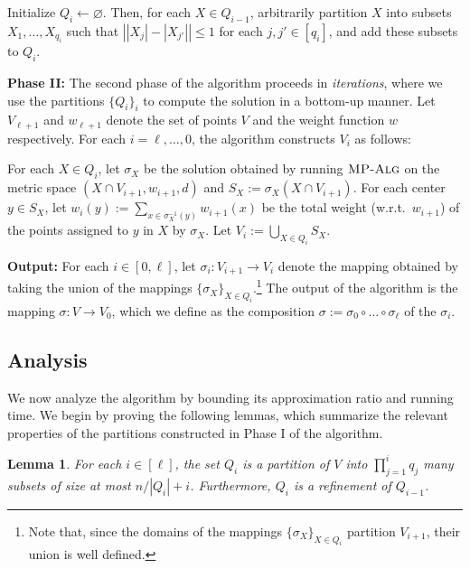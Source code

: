 \documentclass[11pt]{article}
\newenvironment{wrapper}[1]
{
\begin{center}
		\begin{minipage}{\linewidth}
			\begin{mdframed}[hidealllines=true, backgroundcolor=gray!20, leftmargin=0cm,innerleftmargin=0.4cm,innerrightmargin=0.4cm,innertopmargin=0.4cm,innerbottommargin=0.4cm,roundcorner=0pt]
				#1}
			{\end{mdframed}
		\end{minipage}
	\end{center}
}
\newcommand{\1}{\mathmybb{1}}
\newtheorem{lemma}[theorem]{Lemma}
\newcommand{\MPAlg}{\textnormal{\textsc{MP-Alg}}}
\begin{document}
\begin{wrapper}
    Initialize $Q_i \leftarrow \varnothing$. Then, for each $X \in Q_{i-1}$, arbitrarily partition $X$ into subsets $X_1, \dots, X_{q_i}$ such that $\left||X_{j}| - |X_{j'}|\right| \leq 1$ for each $j,j' \in [q_i]$, and add these subsets to $Q_i$.
\end{wrapper}

\medskip
\noindent
\textbf{Phase II:}
The second phase of the algorithm proceeds in \emph{iterations}, where we use the partitions $\{Q_i\}_i$ to compute the solution in a bottom-up manner.
Let $V_{\ell + 1}$ and $w_{\ell + 1}$ denote the set of points $V$ and the weight function $w$ respectively.
For each $i = \ell ,\dots, 0$, the algorithm constructs $V_i$ as follows:

\begin{wrapper}
    For each $X \in Q_i$, let $\sigma_X$ be the solution obtained by running $\MPAlg$ on the metric space $(X \cap V_{i+1},w_{i+1},d)$ and $S_X := \sigma_X(X \cap V_{i+1})$. For each center $y \in S_X$, let $w_i(y) := \sum_{x \in \sigma_{X}^{-1}(y)} w_{i+1}(x)$ be the total weight (w.r.t.~$w_{i+1}$) of the points assigned to $y$ in $X$ by $\sigma_X$. Let $V_i := \bigcup_{X \in Q_i} S_X$.
\end{wrapper}

\medskip
\noindent
\textbf{Output:}
For each $i \in [0, \ell]$, let $\sigma_i : V_{i+1} \longrightarrow V_i$ denote the mapping obtained by taking the union of the mappings $\{\sigma_X\}_{X \in Q_i}$.\footnote{Note that, since the domains of the mappings $\{\sigma_X\}_{X \in Q_i}$ partition $V_{i+1}$, their union is well defined.}
The output of the algorithm is the mapping $\sigma : V \longrightarrow V_0$, which we define as the composition
$\sigma := \sigma_{0} \circ \dots \circ \sigma_{\ell}$ of the $\sigma_i$.

\subsection{Analysis}

We now analyze the algorithm by bounding its approximation ratio and running time. We begin by proving the following lemmas, which summarize the relevant properties of the partitions constructed in Phase I of the algorithm.

\begin{lemma}\label{lem:partitions}
    For each $i \in [\ell]$, the set $Q_i$ is a partition of $V$ into $\prod_{j=1}^i q_j$ many subsets of size at most $n/|Q_i| + i$. Furthermore, $Q_i$ is a refinement of $Q_{i-1}$.
\end{lemma}
\end{document}
